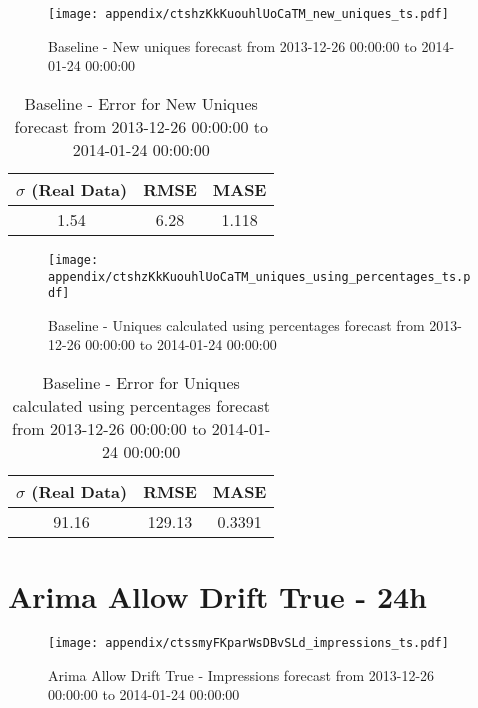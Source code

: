 \begin{figure}[H] \begin{center} \leavevmode
\texttt{[image: appendix/ctshzKkKuouhlUoCaTM\_new\_uniques\_ts.pdf]} \caption{
Baseline - New uniques forecast from 2013-12-26 00:00:00 to 2014-01-24 00:00:00} \label{fig:appendix/ctshzKkKuouhlUoCaTM_new_uniques_ts.pdf} \end{center}
\end{figure}

\begin{table}[H]
\centering
\footnotesize
\begin{tabular}{ccc}
$\sigma$ (Real Data) & RMSE & MASE   \\ \hline
1.54 & 6.28 & 1.118 \\
\end{tabular}

\vspace{0.5cm}

\caption{
Baseline - Error for New Uniques forecast from 2013-12-26 00:00:00 to 2014-01-24 00:00:00}
\end{table}

\begin{figure}[H] \begin{center} \leavevmode
\texttt{[image: appendix/ctshzKkKuouhlUoCaTM\_uniques\_using\_percentages\_ts.pdf]} \caption{
Baseline - Uniques calculated using percentages forecast from 2013-12-26 00:00:00 to 2014-01-24 00:00:00} \label{fig:appendix/ctshzKkKuouhlUoCaTM_uniques_using_percentages_ts.pdf} \end{center}
\end{figure}

\begin{table}[H]
\centering
\footnotesize
\begin{tabular}{ccc}
$\sigma$ (Real Data) & RMSE & MASE   \\ \hline
91.16 & 129.13 & 0.3391 \\
\end{tabular}

\vspace{0.5cm}

\caption{
Baseline - Error for Uniques calculated using percentages forecast from 2013-12-26 00:00:00 to 2014-01-24 00:00:00}
\end{table}

\section{Arima Allow Drift True - 24h}
\begin{figure}[H] \begin{center} \leavevmode
\texttt{[image: appendix/ctssmyFKparWsDBvSLd\_impressions\_ts.pdf]} \caption{
Arima Allow Drift True - Impressions forecast from 2013-12-26 00:00:00 to 2014-01-24 00:00:00} \label{fig:appendix/ctssmyFKparWsDBvSLd_impressions_ts.pdf} \end{center}
\end{figure}

